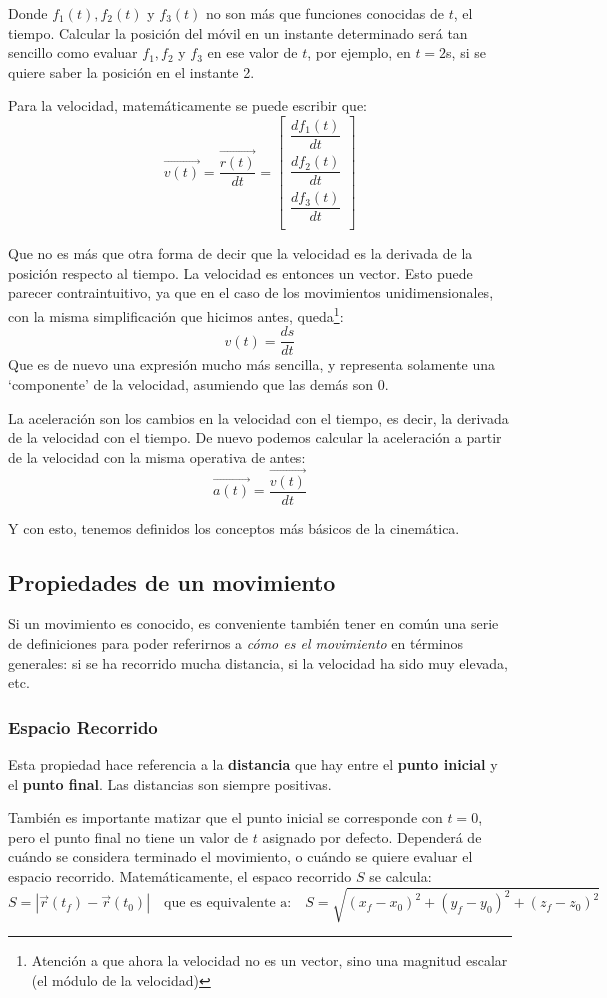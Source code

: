 \documentclass[ %
    oneside,    %
    10pt        %
]{apuntes} %
\begin{document}
Donde $f_1(t), f_2(t)$ y $f_3(t)$ no son más que funciones conocidas de $t$, el tiempo. Calcular la posición del móvil en un instante determinado será tan sencillo como evaluar $f_1, f_2$ y $f_3$ en ese valor de $t$, por ejemplo, en $t = 2$s, si se quiere saber la posición en el instante 2.
\par Para la velocidad, matemáticamente se puede escribir que:
\[\vec{v(t)} =\frac{\vec{r(t)}}{dt} = \left[\begin{array}{c}
			\dfrac{d f_1(t)}{dt} \\
			\dfrac{d f_2(t)}{dt} \\
			\dfrac{d f_3(t)}{dt} \\
		\end{array}\right]\]

Que no es más que otra forma de decir que la velocidad es la derivada de la posición respecto al tiempo. La velocidad es entonces un vector. Esto puede parecer contraintuitivo, ya que en el caso de los movimientos unidimensionales, con la misma simplificación que hicimos antes, queda\footnote{Atención a que ahora la velocidad no es un vector, sino una magnitud escalar (el módulo de la velocidad)}:
\[v(t) = \frac{ds}{dt}\]
Que es de nuevo una expresión mucho más sencilla, y representa solamente una `componente' de la velocidad, asumiendo que las demás son 0.
\par La aceleración son los cambios en la velocidad con el tiempo, es decir, la derivada de la velocidad con el tiempo. De nuevo podemos calcular la aceleración a partir de la velocidad con la misma operativa de antes:
\[\vec{a(t)} =\frac{\vec{v(t)}}{dt}\]

Y con esto, tenemos definidos los conceptos más básicos de la cinemática.

\subsection{Propiedades de un movimiento}
Si un movimiento es conocido, es conveniente también tener en común una serie de definiciones para poder referirnos a \textit{cómo es el movimiento} en términos generales: si se ha recorrido mucha distancia, si la velocidad ha sido muy elevada, etc.

\subsubsection{Espacio Recorrido}
Esta propiedad hace referencia a la \textbf{distancia} que hay entre el \textbf{punto inicial} y el \textbf{punto final}. Las distancias son siempre positivas.
\par También es importante matizar que el punto inicial se corresponde con $t = 0$, pero el punto final no tiene un valor de $t$ asignado por defecto. Dependerá de cuándo se considera terminado el movimiento, o cuándo se quiere evaluar el espacio recorrido. Matemáticamente, el espaco recorrido $S$ se calcula:
\[S = \left|\vec{r}(t_f) - \vec{r}(t_0)\right|\quad \text{que es equivalente a:}\quad S = \sqrt{(x_f - x_0)^2 + (y_f - y_0)^2 + (z_f - z_0)^2}\]
\end{document}

